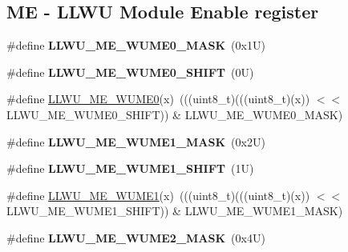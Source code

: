 \subsection*{ME -\/ L\+L\+WU Module Enable register}
\begin{DoxyCompactItemize}
\item 
\mbox{\label{group___l_l_w_u___register___masks_ga5f1588218d510ac13093055708ceae49}} 
\#define {\bfseries L\+L\+W\+U\+\_\+\+M\+E\+\_\+\+W\+U\+M\+E0\+\_\+\+M\+A\+SK}~(0x1\+U)
\item 
\mbox{\label{group___l_l_w_u___register___masks_ga7f653f4ce89c4512437c0114f4659502}} 
\#define {\bfseries L\+L\+W\+U\+\_\+\+M\+E\+\_\+\+W\+U\+M\+E0\+\_\+\+S\+H\+I\+FT}~(0\+U)
\item 
\#define \mbox{\hyperlink{group___l_l_w_u___register___masks_ga57e76f009f14fc197aa6bf7ce0e56f22}{L\+L\+W\+U\+\_\+\+M\+E\+\_\+\+W\+U\+M\+E0}}(x)~(((uint8\+\_\+t)(((uint8\+\_\+t)(x)) $<$$<$ L\+L\+W\+U\+\_\+\+M\+E\+\_\+\+W\+U\+M\+E0\+\_\+\+S\+H\+I\+FT)) \& L\+L\+W\+U\+\_\+\+M\+E\+\_\+\+W\+U\+M\+E0\+\_\+\+M\+A\+SK)
\item 
\mbox{\label{group___l_l_w_u___register___masks_ga99b29643134140d21a3d4259b7f64c86}} 
\#define {\bfseries L\+L\+W\+U\+\_\+\+M\+E\+\_\+\+W\+U\+M\+E1\+\_\+\+M\+A\+SK}~(0x2\+U)
\item 
\mbox{\label{group___l_l_w_u___register___masks_gac623d0db3076972370ee795830b555c1}} 
\#define {\bfseries L\+L\+W\+U\+\_\+\+M\+E\+\_\+\+W\+U\+M\+E1\+\_\+\+S\+H\+I\+FT}~(1\+U)
\item 
\#define \mbox{\hyperlink{group___l_l_w_u___register___masks_ga7537345eb6a634652141bd92b6e1c029}{L\+L\+W\+U\+\_\+\+M\+E\+\_\+\+W\+U\+M\+E1}}(x)~(((uint8\+\_\+t)(((uint8\+\_\+t)(x)) $<$$<$ L\+L\+W\+U\+\_\+\+M\+E\+\_\+\+W\+U\+M\+E1\+\_\+\+S\+H\+I\+FT)) \& L\+L\+W\+U\+\_\+\+M\+E\+\_\+\+W\+U\+M\+E1\+\_\+\+M\+A\+SK)
\item 
\mbox{\label{group___l_l_w_u___register___masks_ga9f19f501dd2ad4aa2f7b01ac8edf8056}} 
\#define {\bfseries L\+L\+W\+U\+\_\+\+M\+E\+\_\+\+W\+U\+M\+E2\+\_\+\+M\+A\+SK}~(0x4\+U)
\item 
\mbox{\label{group___l_l_w_u___register___masks_ga383c567df0dbc9edf2773d29676a7b30}} 

\end{DoxyCompactItemize}
